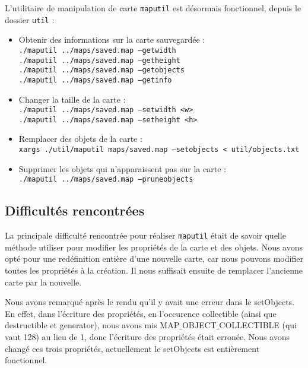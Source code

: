 \documentclass[a4paper, 12pt]{article}
\begin{document}
L'utilitaire de manipulation de carte \texttt{maputil} est désormais fonctionnel, depuis le dossier \texttt{util} :
\begin{itemize}
	\item Obtenir des informations sur la carte sauvegardée : \\
		 \texttt{./maputil ../maps/saved.map --getwidth} \\
		 \texttt{./maputil ../maps/saved.map --getheight} \\
		 \texttt{./maputil ../maps/saved.map --getobjects} \\
		 \texttt{./maputil ../maps/saved.map --getinfo} \\
		
	\item Changer la taille de la carte : \\
		 \texttt{./maputil ../maps/saved.map --setwidth <w>} \\
		 \texttt{./maputil ../maps/saved.map --setheight <h>} \\
	
	\item Remplacer des objets de la carte : \\
		\texttt{xargs ./util/maputil maps/saved.map --setobjects < util/objects.txt} \\
	
	\item Supprimer les objets qui n'apparaissent pas sur la carte : \\
		\texttt{./maputil ../maps/saved.map --pruneobjects}
\end{itemize}

	
	\subsection{Difficultés rencontrées}
		
La principale difficulté rencontrée pour réaliser \texttt{maputil} était de savoir quelle méthode utiliser pour modifier les propriétés de la carte et des objets. Nous avons opté pour une redéfinition entière d'une nouvelle carte, car nous pouvons modifier toutes les propriétés à la création. Il nous suffisait ensuite de remplacer l'ancienne carte par la nouvelle. 

Nous avons remarqué après le rendu qu'il y avait une erreur dans le setObjects. En effet, dans l'écriture des propriétés, en l'occurence collectible (ainsi que destructible et generator), nous avons mis MAP$\_$OBJECT$\_$COLLECTIBLE (qui vaut 128) au lieu de 1,  donc l'écriture des propriétés était erronée. Nous avons changé ces trois propriétés, actuellement le setObjects est entièrement fonctionnel.
	
\end{document}
